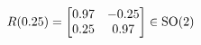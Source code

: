 \documentclass[preview]{standalone}
\begin{document}
\begin{align*}
\special{dvisvgm:raw <g id='unique000'>}R(0.25) = \begin{bmatrix} 0.97 & -0.25 \\ 0.25 & 0.97 \end{bmatrix} \in \text{SO}(2)\special{dvisvgm:raw </g>}
\end{align*}
\end{document}
